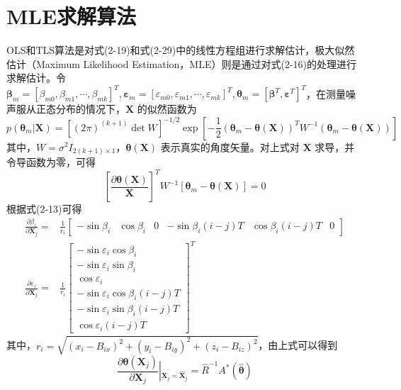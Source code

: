 \section{MLE求解算法}
OLS和TLS算法是对式(2-19)和式(2-29)中的线性方程组进行求解估计，极大似然估计（Maximum Likelihood Estimation，MLE）则是通过对式(2-16)的处理进行求解估计。令$\bm{\beta}_m=[\beta_{m0},\beta_{m1},\cdots,\beta_{mk}]^T,\bm{\varepsilon}_m = [\varepsilon_{m0},\varepsilon_{m1},\cdots,\varepsilon_{mk}]^T,\bm{\theta}_m = [\bm{\beta}^T,\bm{\varepsilon}^T]^T$，在测量噪声服从正态分布的情况下，$\bm{X}$ 的似然函数为
\begin{equation}
	p(\bm{\theta}_m|\bm{X}) = [(2\pi)^{(k+1)}\det W]^{-1/2}\exp[-\frac{1}{2}(\bm{\theta}_m-\bm{\theta}(\bm{X}))^T W^{-1}(\bm{\theta}_m-\bm{\theta}(\bm{X}))]
\end{equation}
其中，$W=\sigma^2 I_{2(k+1)\times 1}$，$\bm{\theta}(\bm{X})$ 表示真实的角度矢量。对上式对 $\bm{X}$ 求导，并令导函数为零，可得
\begin{equation}
	\left[\frac{\partial \bm{\theta}(\bm{X})}{\bm{X}}\right]^T W^{-1}[\bm{\theta}_m - \bm{\theta}(\bm{X})] = 0
\end{equation}
根据式(2-13)可得
\begin{equation}
	\begin{split}
		\frac{\partial \beta_i}{\partial \bm{X}_j} =& \frac{1}{r_i}\left[\begin{array}{cccccc}
			-\sin\beta_i & \cos\beta_i & 0 & -\sin\beta_i(i-j)T & \cos\beta_i(i-j)T & 0
		\end{array}\right] \\
	\frac{\partial \varepsilon_i}{\partial \bm{X}_j} =& \frac{1}{r_i}\left[\begin{array}{c}
		-\sin\varepsilon_i \cos\beta_i \\ -\sin\varepsilon_i \sin\beta_i \\ \cos\varepsilon_i \\ -\sin\varepsilon_i\cos\beta_i(i-j)T \\ -\sin\varepsilon_i\sin\beta_i (i-j)T \\ \cos\varepsilon_i(i-j)T
	\end{array}\right]^T
	\end{split}
\end{equation}
其中，$r_i=\sqrt{(x_i-B_{ix})^2 + (y_i - B_{iy})^2 + (z_i - B_{iz})^2}$，由上式可以得到
\begin{equation}
	\frac{\partial \bm{\theta}(\bm{X}_j)}{\partial \bm{X}_j} \left|_{\bm{X}_j = \hat{\bm{X}}_j} \right.= \hat{R}^{-1} A^*(\hat{\bm{\theta}})
\end{equation} 

